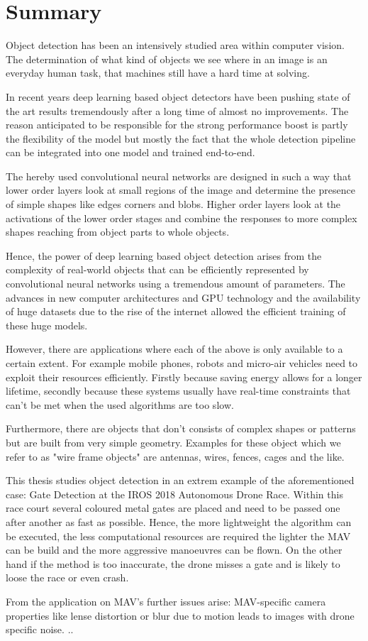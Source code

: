 \chapter*{Summary}

Object detection has been an intensively studied area within computer vision. The determination of what kind of objects we see where in an image is an everyday human task, that machines still have a hard time at solving.

In recent years deep learning based object detectors have been pushing state of the art results tremendously after a long time of almost no improvements. The reason anticipated to be responsible for the strong performance boost is partly the flexibility of the model but mostly the fact that the whole detection pipeline can be integrated into one model and trained end-to-end.

The hereby used convolutional neural networks are designed in such a way that lower order layers look at small regions of the image and determine the presence of simple shapes like edges corners and blobs. Higher order layers look at the activations of the lower order stages and combine the responses to more complex shapes reaching from object parts to whole objects.

Hence, the power of deep learning based object detection arises from the complexity of real-world objects that can be efficiently represented by convolutional neural networks using a tremendous amount of parameters. The advances in new computer architectures and GPU technology and the availability of huge datasets due to the rise of the internet allowed the efficient training of these huge models.

However, there are applications where each of the above is only available to a certain extent. For example mobile phones, robots and micro-air vehicles need to exploit their resources efficiently. Firstly because saving energy allows for a longer lifetime, secondly because these systems usually have real-time constraints that can't be met when the used algorithms are too slow.

Furthermore, there are objects that don't consists of complex shapes or patterns but are built from very simple geometry. Examples for these object which we refer to as "wire frame objects" are antennas, wires, fences, cages and the like. 

This thesis studies object detection in an extrem example of the aforementioned case: Gate Detection at the IROS 2018 Autonomous Drone Race. Within this race court several coloured metal gates are placed and need to be passed one after another as fast as possible. Hence, the more lightweight the algorithm can be executed, the less computational resources are required the lighter the MAV can be build and the more aggressive manoeuvres can be flown. On the other hand if the method is too inaccurate, the drone misses a gate and is likely to loose the race or even crash.

From the application on MAV's further issues arise: MAV-specific camera properties like lense distortion or blur due to motion leads to images with drone specific noise. ..


